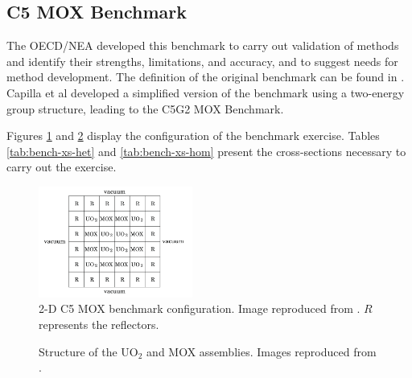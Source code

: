 \documentclass[letterpaper]{article}
\begin{document}
\subsection{C5 MOX Benchmark}
\label{sec:bench}

The \gls{OECD}/\gls{NEA} developed this benchmark to carry out validation of methods and identify their strengths, limitations, and accuracy, and to suggest needs for method development.
The definition of the original benchmark can be found in \cite{oecdnea_benchmark_2003}.
Capilla et al \cite{capilla_applications_2009} developed a simplified version of the benchmark using a two-energy group structure, leading to the C5G2 MOX Benchmark.

Figures \ref{res:2d-bench-config1} and \ref{res:2d-bench-config2} display the configuration of the benchmark exercise.
Tables \ref{tab:bench-xs-het} and \ref{tab:bench-xs-hom} present the cross-sections necessary to carry out the exercise.

\begin{figure}[h!]
    \centering
    \includegraphics[width=0.45\textwidth]{../C5G2-benchmark/bench-config}
    \caption{2-D C5 MOX benchmark configuration. Image reproduced from \cite{capilla_applications_2009}. $R$ represents the reflectors.}
    \label{res:2d-bench-config1}
\end{figure}

\begin{figure}[htbp!]
    \centering
    \caption{Structure of the UO$_2$ and MOX assemblies. Images reproduced from \cite{capilla_applications_2009}.}
    \label{res:2d-bench-config2}
\end{figure}
\end{document}
